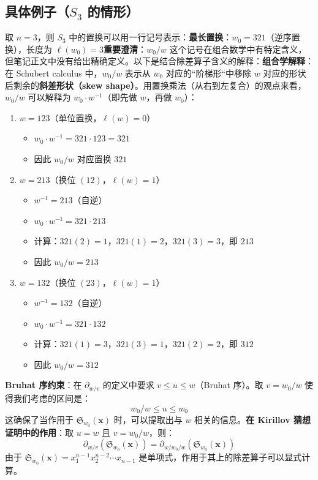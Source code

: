 \subsection{具体例子（$S_3$ 的情形）}取 $n = 3$，则 $S_3$ 中的置换可以用一行记号表示：\textbf{最长置换}：$w_0 = 321$（逆序置换），长度为 $\ell(w_0) = 3$\textbf{重要澄清}：$w_0 / w$ 这个记号在组合数学中有特定含义，但笔记正文中没有给出精确定义。以下是结合除差算子含义的解释：\textbf{组合学解释}：在 Schubert calculus 中，$w_0 / w$ 表示从 $w_0$ 对应的``阶梯形``中移除 $w$ 对应的形状后剩余的\textbf{斜差形状（skew shape）}。用置换乘法（从右到左复合）的观点来看，$w_0 / w$ 可以解释为 $w_0 \cdot w^{-1}$（即先做 $w$，再做 $w_0$）：
\begin{enumerate}
\item $w = 123$（单位置换，$\ell(w) = 0$）  
\begin{itemize}  \item $w_0 \cdot w^{-1} = 321 \cdot 123 = 321$  \item 因此 $w_0 / w$ 对应置换 $321$  
\end{itemize}\item $w = 213$（换位 $(12)$，$\ell(w) = 1$）  
\begin{itemize}  \item $w^{-1} = 213$（自逆）  \item $w_0 \cdot w^{-1} = 321 \cdot 213$  \item 计算：$321(2) = 1$，$321(1) = 2$，$321(3) = 3$，即 $213$  \item 因此 $w_0 / w = 213$  
\end{itemize}\item $w = 132$（换位 $(23)$，$\ell(w) = 1$）  
\begin{itemize}  \item $w^{-1} = 132$（自逆）  \item $w_0 \cdot w^{-1} = 321 \cdot 132$  \item 计算：$321(1) = 3$，$321(3) = 1$，$321(2) = 2$，即 $312$  \item 因此 $w_0 / w = 312$  
\end{itemize}
\end{enumerate}

\textbf{Bruhat 序约束}：在 $\partial_{w/v}$ 的定义中要求 $v \leq u \leq w$（Bruhat 序）。取 $v = w_0 / w$ 使得我们考虑的区间是：$$w_0 / w \leq u \leq w_0$$这确保了当作用于 $\mathfrak{S}_{w_0}(\mathbf{x})$ 时，可以提取出与 $w$ 相关的信息。\textbf{在 Kirillov 猜想证明中的作用}：取 $u = w$ 且 $v = w_0 / w$，则：$$\partial_{w/v}(\mathfrak{S}_{w_0}(\mathbf{x})) = \partial_{w/w_0/w}(\mathfrak{S}_{w_0}(\mathbf{x}))$$由于 $\mathfrak{S}_{w_0}(\mathbf{x}) = x_1^{n-1}x_2^{n-2}\cdots x_{n-1}$ 是单项式，作用于其上的除差算子可以显式计算。
